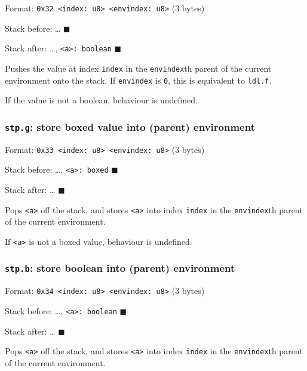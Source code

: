 Format:
\texttt{0x32\ \textless{}index:\ u8\textgreater{}\ \textless{}envindex:\ u8\textgreater{}}
(3 bytes)

Stack before: \ldots{} \(\blacksquare\)

Stack after: \ldots, \texttt{\textless{}a\textgreater{}:\ boolean}
\(\blacksquare\)

Pushes the value at index \texttt{index} in the \texttt{envindex}th
parent of the current environment onto the stack. If \texttt{envindex}
is \texttt{0}, this is equivalent to \texttt{ldl.f}.

If the value is not a boolean, behaviour is undefined.

\subsubsection{\texorpdfstring{\texttt{stp.g}: store boxed value into
(parent)
environment}{stp.g: store boxed value into (parent) environment}}

Format:
\texttt{0x33\ \textless{}index:\ u8\textgreater{}\ \textless{}envindex:\ u8\textgreater{}}
(3 bytes)

Stack before: \ldots, \texttt{\textless{}a\textgreater{}:\ boxed}
\(\blacksquare\)

Stack after: \ldots{} \(\blacksquare\)

Pops \texttt{\textless{}a\textgreater{}} off the stack, and stores
\texttt{\textless{}a\textgreater{}} into index \texttt{index} in the
\texttt{envindex}th parent of the current environment.

If \texttt{\textless{}a\textgreater{}} is not a boxed value, behaviour
is undefined.

\subsubsection{\texorpdfstring{\texttt{stp.b}: store boolean into
(parent) environment}{stp.b: store boolean into (parent) environment}}

Format:
\texttt{0x34\ \textless{}index:\ u8\textgreater{}\ \textless{}envindex:\ u8\textgreater{}}
(3 bytes)

Stack before: \ldots, \texttt{\textless{}a\textgreater{}:\ boolean}
\(\blacksquare\)

Stack after: \ldots{} \(\blacksquare\)

Pops \texttt{\textless{}a\textgreater{}} off the stack, and stores
\texttt{\textless{}a\textgreater{}} into index \texttt{index} in the
\texttt{envindex}th parent of the current environment.

